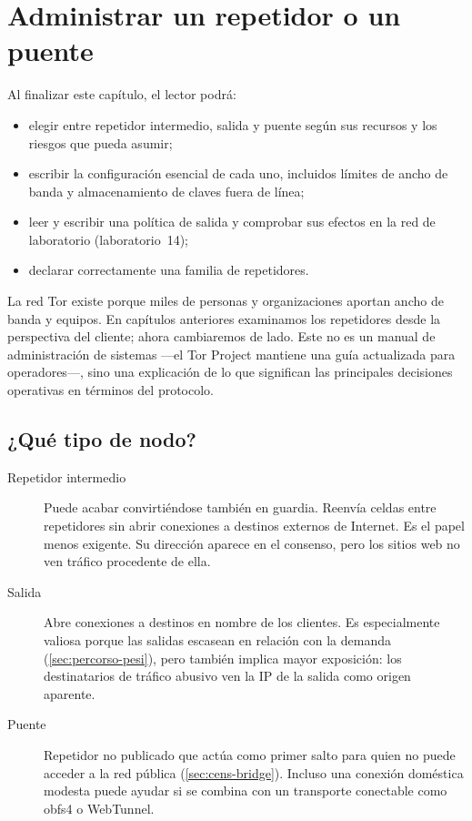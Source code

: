 \chapter{Administrar un repetidor o un puente}\label{cap:22-relay}

\begin{obiettivi}
Al finalizar este capítulo, el lector podrá:
\begin{itemize}[nosep]
  \item elegir entre repetidor intermedio, salida y puente según sus recursos y los riesgos que pueda asumir;
  \item escribir la configuración esencial de cada uno, incluidos límites de ancho de banda y almacenamiento de claves fuera de línea;
  \item leer y escribir una política de salida y comprobar sus efectos en la red de laboratorio (laboratorio~14);
  \item declarar correctamente una familia de repetidores.
\end{itemize}
\end{obiettivi}

La red Tor existe porque miles de personas y organizaciones aportan ancho de banda y equipos. En capítulos anteriores examinamos los repetidores desde la perspectiva del cliente; ahora cambiaremos de lado. Este no es un manual de administración de sistemas ---el Tor Project mantiene una guía actualizada para operadores---, sino una explicación de lo que significan las principales decisiones operativas en términos del protocolo.

\section{¿Qué tipo de nodo?}\label{sec:relay-tipi}

\begin{description}
  \item[Repetidor intermedio] Puede acabar convirtiéndose también en guardia. Reenvía celdas entre repetidores sin abrir conexiones a destinos externos de Internet. Es el papel menos exigente. Su dirección aparece en el consenso, pero los sitios web no ven tráfico procedente de ella.
  \item[Salida] Abre conexiones a destinos en nombre de los clientes. Es especialmente valiosa porque las salidas escasean en relación con la demanda (\cref{sec:percorso-pesi}), pero también implica mayor exposición: los destinatarios de tráfico abusivo ven la IP de la salida como origen aparente.
  \item[Puente] Repetidor no publicado que actúa como primer salto para quien no puede acceder a la red pública (\cref{sec:cens-bridge}). Incluso una conexión doméstica modesta puede ayudar si se combina con un transporte conectable como obfs4 o WebTunnel.
\end{description}

